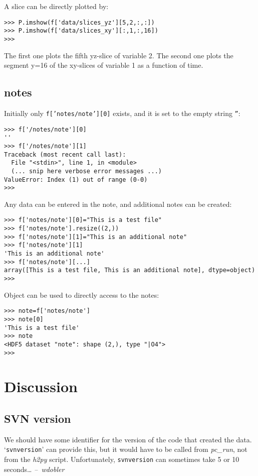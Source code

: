\documentclass[a4paper,12pt]{article}
\begin{document}
A slice can be directly plotted by:
\begin{verbatim}
>>> P.imshow(f['data/slices_yz'][5,2,:,:])
>>> P.imshow(f['data/slices_xy'][:,1,:,16])
>>>
\end{verbatim}
The first one plots the fifth yz-slice of variable 2. The second one
plots the segment y=16 of the xy-slices of variable 1 as a function of
time. 


\subsection{notes}
\label{sec:notes}

Initially only \texttt{f['notes/note'][0]} exists, and it is
set to the empty string \texttt{''}:
\begin{verbatim}
>>> f['/notes/note'][0]
''
>>> f['/notes/note'][1]
Traceback (most recent call last):
  File "<stdin>", line 1, in <module>
  (... snip here verbose error messages ...)
ValueError: Index (1) out of range (0-0)
>>>
\end{verbatim}

Any data can be entered in the note, and additional notes can be created:
\begin{verbatim}
>>> f['notes/note'][0]="This is a test file"
>>> f['notes/note'].resize((2,))
>>> f['notes/note'][1]="This is an additional note"
>>> f['notes/note'][1]
'This is an additional note'
>>> f['notes/note'][...]
array([This is a test file, This is an additional note], dtype=object)
>>> 
\end{verbatim}

Object can be used to directly access to the notes:
\begin{verbatim}
>>> note=f['notes/note']
>>> note[0]
'This is a test file'
>>> note
<HDF5 dataset "note": shape (2,), type "|O4">
>>> 
\end{verbatim}

\section{Discussion}
\label{sec:discussion}

\subsection{SVN version}
\label{sec:svn-version}



We should have some identifier for the version of the code that created
the data.
`\texttt{svnversion}' can provide this, but it would have to be called
from \emph{pc\_run}, not from the \emph{h2py} script.
Unfortunately, \texttt{svnversion} can sometimes take 5 or 10
seconds\ldots
\emph{\quad--~wdobler}
\end{document}
